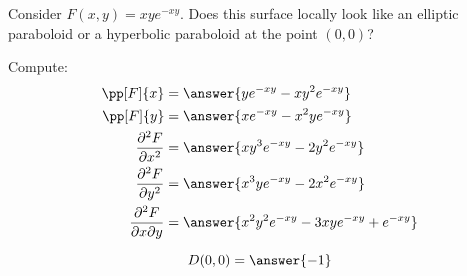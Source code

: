 \documentclass{ximera}
\begin{document}
\begin{question}
  Consider $F(x,y) = x y e^{-xy}$. Does this surface locally look like
  an elliptic paraboloid or a hyperbolic paraboloid at the point
  $(0,0)$?
  \begin{prompt}
    Compute:
    \begin{align*}
      \pp[F]{x} &= \answer{y e^{-x y}-xy^2e^{-x y}}\\
      \pp[F]{y} &= \answer{x e^{-x y}-x^2ye^{-x y}}\\
      \frac{\partial^2F}{\partial x^2} &= \answer{xy^3e^{-xy}-2y^2e^{-xy}}\\
      \frac{\partial^2F}{\partial y^2} &= \answer{x^3ye^{-xy}-2x^2e^{-xy}}\\
      \frac{\partial^2F}{\partial x\partial y} &= \answer{x^2 y^2 e^{-x y}-3 x y e^{-x y}+e^{-x y}}\\
    \end{align*}
    \begin{question}
      \[
      D(0,0) = \answer{-1}
      \]
      \begin{question}
        \begin{multipleChoice}
        \end{multipleChoice}
      \end{question}
    \end{question}
  \end{prompt}
\end{question}
\end{document}
